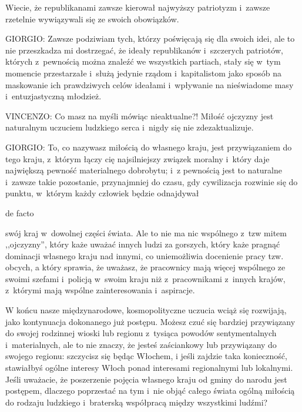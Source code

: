 \documentclass[oneside,polish,11pt,sfheadings]{mwbk}
\begin{document}
 
Wiecie, że republikanami zawsze kierował najwyższy patriotyzm i~zawsze rzetelnie wywiązywali się ze swoich
obowiązków. 




 
\noindent GIORGIO: Zawsze podziwiam tych, którzy poświęcają się dla swoich idei, ale to nie przeszkadza mi dostrzegać, że ideały
republikanów i~szczerych patriotów, których z~pewnością można znaleźć we wszystkich partiach, stały się w~tym momencie
przestarzałe i~służą jedynie rządom i~kapitalistom jako sposób na maskowanie ich prawdziwych celów ideałami i~wpływanie
na nieświadome masy i~entuzjastyczną młodzież. 




 
\noindent VINCENZO: Co masz na myśli mówiąc nieaktualne?! Miłość ojczyzny jest naturalnym uczuciem ludzkiego serca i~nigdy się nie
zdezaktualizuje. 




 
\noindent GIORGIO: To, co nazywasz miłością do własnego kraju, jest przywiązaniem do tego kraju, z~którym łączy cię najsilniejszy
związek moralny i~który daje największą pewność materialnego dobrobytu; i~z pewnością jest to naturalne i~zawsze takie
pozostanie, przynajmniej do czasu, gdy cywilizacja rozwinie się do punktu, w~którym każdy człowiek będzie odnajdywał
\begin{itshape}de facto \end{itshape} swój kraj w~dowolnej części świata. Ale to nie ma nic
wspólnego z~tzw mitem ,,ojczyzny'', który każe uważać innych ludzi za gorszych, który każe pragnąć dominacji własnego
kraju nad innymi, co uniemożliwia docenienie pracy tzw. obcych, a który sprawia, że uważasz, że pracownicy mają więcej
wspólnego ze swoimi szefami i~policją w~swoim kraju niż z~pracownikami z~innych krajów, z~którymi mają wspólne
zainteresowania i~aspiracje. 

 
W końcu nasze międzynarodowe, kosmopolityczne uczucia wciąż się rozwijają, jako kontynuacja dokonanego już postępu.
Możesz czuć się bardziej przywiązany do swojej rodzinnej wioski lub regionu z~tysiąca powodów sentymentalnych i~materialnych, ale to nie znaczy, że jesteś zaściankowy lub przywiązany do swojego regionu: szczycisz się będąc Włochem,
i jeśli zajdzie taka konieczność, stawiałbyś ogólne interesy Włoch ponad interesami regionalnymi lub lokalnymi. Jeśli
uważacie, że poszerzenie pojęcia własnego kraju od gminy do narodu jest postępem, dlaczego poprzestać na tym i~nie
objąć całego świata ogólną miłością do rodzaju ludzkiego i~braterską współpracą między wszystkimi ludźmi? 
\end{document}
